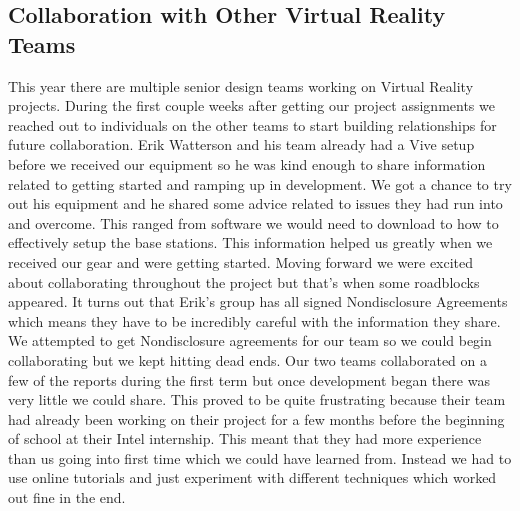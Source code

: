 \documentclass[10pt,journal,compsoc,onecolumn, draftclsnofoot]{IEEEtran}
\begin{document}
\subsection{Collaboration with Other Virtual Reality Teams}
This year there are multiple senior design teams working on Virtual Reality projects.
During the first couple weeks after getting our project assignments we reached out to individuals on the other teams to start building relationships for future collaboration.
Erik Watterson and his team already had a Vive setup before we received our equipment so he was kind enough to share information related to getting started and ramping up in development.
We got a chance to try out his equipment and he shared some advice related to issues they had run into and overcome.
This ranged from software we would need to download to how to effectively setup the base stations.
This information helped us greatly when we received our gear and were getting started.
Moving forward we were excited about collaborating throughout the project but that’s when some roadblocks appeared.
It turns out that Erik’s group has all signed Nondisclosure Agreements which means they have to be incredibly careful with the information they share.
We attempted to get Nondisclosure agreements for our team so we could begin collaborating but we kept hitting dead ends.
Our two teams collaborated on a few of the reports during the first term but once development began there was very little we could share.
This proved to be quite frustrating because their team had already been working on their project for a few months before the beginning of school at their Intel internship.
This meant that they had more experience than us going into first time which we could have learned from.
Instead we had to use online tutorials and just experiment with different techniques which worked out fine in the end.
\end{document}
